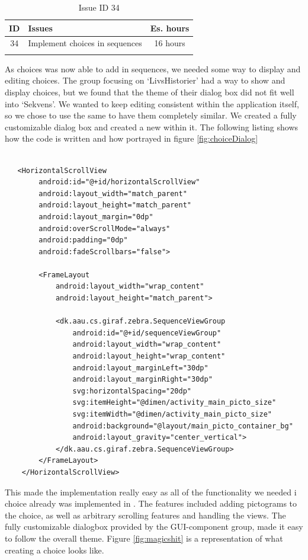\begin{longtable} { | c | p{12cm} | c | } 
\hline
	ID 	&	Issues	&		 Es. hours \\\hline
	34 	&	Implement choices in sequences	&	16 hours \\\hline
\caption{Issue ID 34}
\label{tab:spr3_choicesinsequences}
\end{longtable}

As choices was now able to add in sequences, we needed some way to display and editing choices. The group focusing on `LivsHistorier' had a way to show and display choices, but we found that the theme of their dialog box did not fit well into `Sekvens'. We wanted to keep editing consistent within the application itself, so we chose to use the same  to have them completely similar. We created a fully customizable dialog box and created a new  within it. The following listing shows how the code is written and how portrayed in figure \ref{fig:choiceDialog}

\begin{lstlisting}

   <HorizontalScrollView
        android:id="@+id/horizontalScrollView"
        android:layout_width="match_parent"
        android:layout_height="match_parent"
        android:layout_margin="0dp"
        android:overScrollMode="always"
        android:padding="0dp"
        android:fadeScrollbars="false">

        <FrameLayout
            android:layout_width="wrap_content"
            android:layout_height="match_parent">

            <dk.aau.cs.giraf.zebra.SequenceViewGroup
                android:id="@+id/sequenceViewGroup"
                android:layout_width="wrap_content"
                android:layout_height="wrap_content"
                android:layout_marginLeft="30dp"
                android:layout_marginRight="30dp"
                svg:horizontalSpacing="20dp"
                svg:itemHeight="@dimen/activity_main_picto_size"
                svg:itemWidth="@dimen/activity_main_picto_size"
                android:background="@layout/main_picto_container_bg"
                android:layout_gravity="center_vertical">
            </dk.aau.cs.giraf.zebra.SequenceViewGroup>
        </FrameLayout>
    </HorizontalScrollView>

\end{lstlisting}

This made the implementation really easy as all of the functionality we needed i choice already was implemented in . The features included adding pictograms to the choice, as well as arbitrary scrolling features and handling the views. The fully customizable dialogbox provided by the GUI-component group, made it easy to follow the overall theme. Figure \ref{fig:magicshit} is a representation of what creating a choice looks like.

